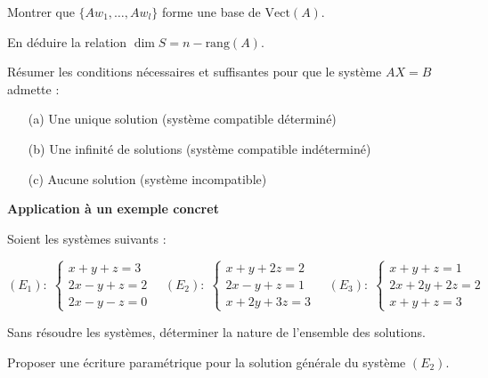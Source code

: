 \documentclass[10pt,a4paper]{article}
\begin{document}
\q Montrer que $\{Aw_1, \ldots, Aw_l\}$ forme une base de $\text{Vect}(A)$.

\q En déduire la relation $\dim S = n - \text{rang}(A)$.

\q Résumer les conditions nécessaires et suffisantes pour que le système $AX = B$ admette :
\begin{itemize}
    \item[(a)] Une unique solution (système compatible déterminé)
    \item[(b)] Une infinité de solutions (système compatible indéterminé)
    \item[(c)] Aucune solution (système incompatible)
\end{itemize}

\bigskip
\textbf{Application à un exemple concret}

Soient les systèmes suivants :

$$ (E_1) : \;
\begin{cases}
x + y + z = 3 \\
2x - y + z = 2 \\
2x - y - z = 0
\end{cases}
\quad
(E_2) : \;
\begin{cases}
x + y + 2z = 2 \\
2x - y + z = 1 \\
x + 2y + 3z = 3
\end{cases}
\quad
(E_3) : \;
\begin{cases}
x + y + z = 1 \\
2x + 2y + 2z = 2 \\
x + y + z = 3
\end{cases}
$$

\q Sans résoudre les systèmes, déterminer la nature de l'ensemble des solutions.

\q Proposer une écriture paramétrique pour la solution générale du système $(E_2)$.
\end{document}
